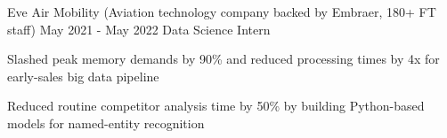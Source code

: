 \vspace{0.1 cm}

\begin{experience}
                   {Eve Air Mobility \textnormal{(Aviation technology company backed by Embraer, 180+ FT staff)}}
                   {May 2021 - May 2022}
                   {Data Science Intern}
    \item Slashed peak memory demands by 90\% and reduced processing times by 4x for early-sales big data pipeline
    \item Reduced routine competitor analysis time by 50\% by building Python-based models for named-entity recognition 
\end{experience}